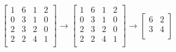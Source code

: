 \[
\left[
\begin{array}{cccc}
1 & 6 & 1 & 2 \\
0 & 3 & 1 & 0 \\
2 & 3 & 2 & 0 \\
2 & 2 & 4 & 1 \\
\end{array}
\right]
\longrightarrow
\left[
\begin{array}{cc|cc}
1 & 6 & 1 & 2 \\
0 & 3 & 1 & 0 \\
\hline
2 & 3 & 2 & 0 \\
2 & 2 & 4 & 1 \\
\end{array}
\right]
\longrightarrow
\left[
\begin{array}{cc}
6 & 2 \\
3 & 4 \\
\end{array}
\right]
\]